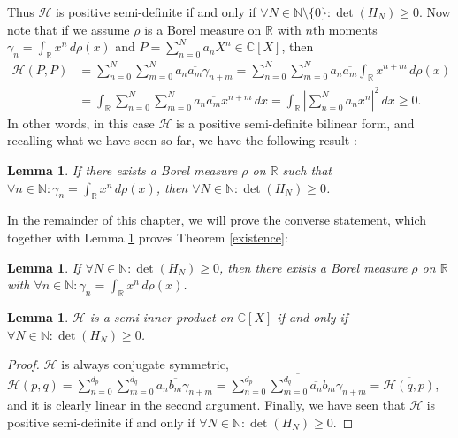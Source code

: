 \documentclass[12pt,oneside]{report}
\newtheorem{lem}[thm]{Lemma}
\begin{document}
Thus $\mathcal{H}$ is positive semi-definite if and only if $\forall N \in \mathbb{N} \setminus \{ 0 \}: \det(H_{N}) \geq 0$. Now note that if we assume $\rho$ is a Borel measure on $\mathbb{R}$ with $n$th moments $\gamma_{n} = \int _{\mathbb{R}} x^{n} \, d\rho(x)$ and $P = \sum_{n=0}^{N} a_{n}X^{n} \in \mathbb{C}[X]$, then
\begin{align*}
\mathcal{H}(P,P) &= \sum_{n=0}^{N} \sum_{m=0}^{N} a_{n}\overline{a_{m}} \gamma_{n+m} = \sum_{n=0}^{N} \sum_{m=0}^{N} a_{n}\overline{a_{m}} \int _{\mathbb{R}} x^{n+m} \, d\rho(x) \\
&= \int _{\mathbb{R}} \sum_{n=0}^{N} \sum_{m=0}^{N} a_{n}\overline{a_{m}} x^{n+m} \, dx = \int _{\mathbb{R}} \left| \sum_{n=0}^{N} a_{n} x^{n} \right|^{2} \, dx \geq 0.
\end{align*}
In other words, in this case $\mathcal{H}$ is a positive semi-definite bilinear form, and recalling what we have seen so far, we have the following result \cite{simon_classical_1998}:

\begin{lem}\label{exists-easy-dir}
    If there exists a Borel measure $\rho$ on $\mathbb{R}$ such that $\forall n \in \mathbb{N}: \gamma_{n} = \int _{\mathbb{R}} x^{n} \, d\rho(x)$, then $\forall N \in \mathbb{N}: \det(H_{N}) \geq 0$.
\end{lem}

In the remainder of this chapter, we will prove the converse statement, which together with Lemma \ref{exists-easy-dir} proves Theorem \ref{existence}:

\begin{lem}
    If $\forall N \in \mathbb{N}: \det(H_{N}) \geq 0$, then there exists a Borel measure $\rho$ on $\mathbb{R}$ with $\forall n \in \mathbb{N}: \gamma_{n} = \int _{\mathbb{R}} x^{n} \, d\rho(x)$.
\end{lem}

\begin{lem}
    $\mathcal{H}$ is a semi inner product on $\mathbb{C}[X]$ if and only if $\forall N \in \mathbb{N}: \det(H_{N}) \geq 0$.
\end{lem}
\begin{proof}
    $\mathcal{H}$ is always conjugate symmetric, $\mathcal{H}(p,q) = \sum_{n=0}^{d_{p}}\sum_{m=0}^{d_{q}} a_{n}\overline{b_{m}}\gamma_{n+m} = \overline{\sum_{n=0}^{d_{p}}\sum_{m=0}^{d_{q}} \overline{a_{n}}b_{m}\gamma_{n+m}} = \overline{\mathcal{H}(q,p)}$, and it is clearly linear in the second argument. Finally, we have seen that $\mathcal{H}$ is positive semi-definite if and only if $\forall N \in \mathbb{N}: \det(H_{N}) \geq 0$.
\end{proof}
\end{document}
